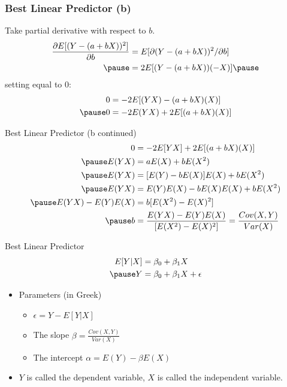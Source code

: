 \documentclass[aspectratio=169, handout]{beamer}
\numberwithin{equation}{section}
\begin{document}
\begin{frame}
\frametitle{Best Linear Predictor (b)}
Take partial derivative with respect to $b$.\pause
\begin{align*}
\frac{\partial E[(Y-(a+bX))^2]}{\partial b}&= E[\partial(Y-(a+bX))^2/\partial b]\\\pause
&= 2E[(Y-(a+bX))(-X)]\pause
\end{align*} 
setting equal to 0:\pause
\begin{align*}
0&= -2E[(YX)-(a+bX)(X)]\\\pause
0&= -2E(YX)+2E[(a+bX)(X)]
\end{align*} 
\end{frame}


\begin{frame}{Best Linear Predictor (b continued)}
\begin{align*}
0&= -2E[YX]+2E[(a+bX)(X)]\\\pause
E(YX)&= aE(X)+bE(X^2)\\\pause
E(YX)&= [E(Y)-bE(X)]E(X)+bE(X^2)\\\pause
E(YX)&= E(Y)E(X)-bE(X)E(X)+bE(X^2)\\\pause
E(YX)-E(Y)E(X)&= b[E(X^2)-E(X)^2]\\\pause
b&=\frac{E(YX)-E(Y)E(X)}{[E(X^2)-E(X)^2]}=\frac{Cov(X,Y)}{Var(X)}\\
\end{align*} 
\end{frame}

\begin{frame}{Best Linear Predictor}
\begin{align*}
E[Y|X]&=\beta_0+\beta_1X\\\pause
Y&=\beta_0+\beta_1X+\epsilon
\end{align*} 
\begin{itemize}\pause
\item Parameters (in Greek)
\begin{itemize}
\item $\epsilon=Y-E[Y|X]$
\item The slope $\beta =\frac{Cov(X,Y)}{Var(X)}$
\item The intercept $\alpha=E(Y)-\beta E(X)$
\end{itemize}\pause
\item $Y$ is called the dependent variable, $X$ is called the independent variable.
\end{itemize}
\end{frame}
\end{document}
